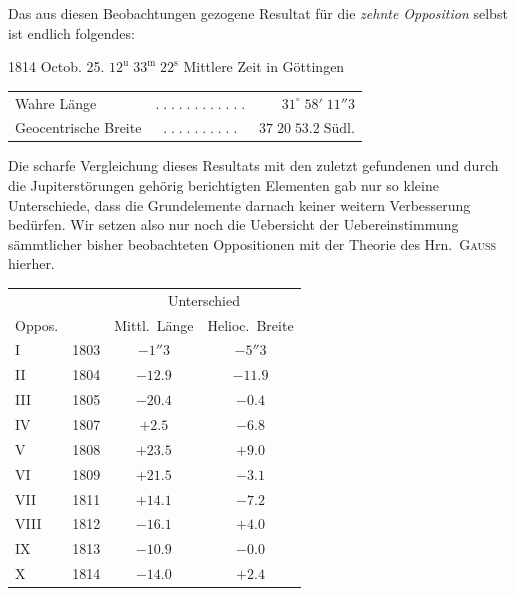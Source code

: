 \par\indent Das aus diesen Beobachtungen gezogene Resultat für die \emph{zehnte Opposition} selbst ist endlich folgendes:

\begin{center}1814 Octob. 25. $12^{\mathrm u}\;33^{\mathrm m}\;22^{\mathrm s}$ Mittlere Zeit in Göttingen\end{center}
\begin{center}\fontsize{10}{12}\selectfont\setlength{\tabcolsep}{3pt}\renewcommand{\arraystretch}{1.15}\begin{tabular}{lcr}
Wahre Länge & $.\;.\;.\;.\;.\;.\;.\;.\;.\;.\;.\;.$ & $31^\circ\;58'\;11''3$\\
Geocentrische Breite & $.\;.\;.\;.\;.\;.\;.\;.\;.\;.$ & $37\;20\;53.2\;\mathrm{Südl.}$\\
\end{tabular}\end{center}

\par\indent Die scharfe Vergleichung dieses Resultats mit den zuletzt gefundenen und durch die Jupiterstörungen gehörig berichtigten Elementen gab nur so kleine Unterschiede, dass die Grundelemente darnach keiner weitern Verbesserung bedürfen. Wir setzen also nur noch die Uebersicht der Uebereinstimmung sämmtlicher bisher beobachteten Oppositionen mit der Theorie des Hrn.\ \textsc{Gauss} hierher.

\begin{center}
\fontsize{10}{12}\selectfont\setlength{\tabcolsep}{5pt}\renewcommand{\arraystretch}{1.15}\begin{tabular}{l|l|c|c}
 & & \multicolumn{2}{c}{Unterschied} \\
Oppos. & & Mittl.\ Länge & Helioc.\ Breite \\
\hline
I & 1803 & $-1''3$ & $-5''3$ \\
II & 1804 & $-12.9$ & $-11.9$ \\
III & 1805 & $-20.4$ & $-0.4$ \\
IV & 1807 & $+2.5$ & $-6.8$ \\
V & 1808 & $+23.5$ & $+9.0$ \\
VI & 1809 & $+21.5$ & $-3.1$ \\
VII & 1811 & $+14.1$ & $-7.2$ \\
VIII & 1812 & $-16.1$ & $+4.0$ \\
IX & 1813 & $-10.9$ & $-0.0$ \\
X & 1814 & $-14.0$ & $+2.4$ \\
\end{tabular}
\end{center}
